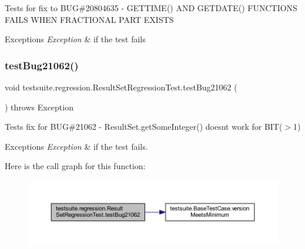 Tests for fix to B\+UG\#20804635 -\/ G\+E\+T\+T\+I\+M\+E() A\+ND G\+E\+T\+D\+A\+T\+E() F\+U\+N\+C\+T\+I\+O\+NS F\+A\+I\+LS W\+H\+EN F\+R\+A\+C\+T\+I\+O\+N\+AL P\+A\+RT E\+X\+I\+S\+TS


\begin{DoxyExceptions}{Exceptions}
{\em Exception} & if the test fails \\
\hline
\end{DoxyExceptions}
\mbox{\label{classtestsuite_1_1regression_1_1_result_set_regression_test_a18bcdff4c2c8f2245a2e5bb6696e2506}} 
\subsubsection{\texorpdfstring{test\+Bug21062()}{testBug21062()}}
{\footnotesize\ttfamily void testsuite.\+regression.\+Result\+Set\+Regression\+Test.\+test\+Bug21062 (\begin{DoxyParamCaption}{ }\end{DoxyParamCaption}) throws Exception}

Tests fix for B\+UG\#21062 -\/ Result\+Set.\+get\+Some\+Integer() doesn\textquotesingle{}t work for B\+I\+T($>$1)


\begin{DoxyExceptions}{Exceptions}
{\em Exception} & if the test fails. \\
\hline
\end{DoxyExceptions}
Here is the call graph for this function\+:
\nopagebreak
\begin{figure}[H]
\begin{center}
\leavevmode
\includegraphics[width=350pt]{classtestsuite_1_1regression_1_1_result_set_regression_test_a18bcdff4c2c8f2245a2e5bb6696e2506_cgraph}
\end{center}
\end{figure}
\mbox{\label{classtestsuite_1_1regression_1_1_result_set_regression_test_a0e70ddab19727d4cb909e12706e43cff}} 
